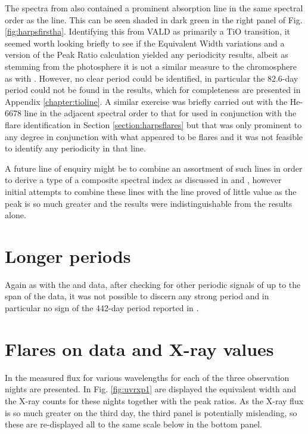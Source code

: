 The spectra from {\harps} also contained a prominent absorption line in the same spectral order as the {\ha} line. This
can be seen shaded in dark green in the right panel of Fig. \ref{fig:harpsfirstha}. Identifying this from VALD as
primarily a TiO transition, it seemed worth looking briefly to see if the Equivalent Width variations and a version of
the Peak Ratio calculation yielded any periodicity results, albeit as stemming from the photosphere it is not a similar
measure to the chromosphere as with \ha. However, no clear period could be identified, in particular the 82.6-day period
could not be found in the results, which for completeness are presented in Appendix \ref{chapter:tioline}. A similar
exercise was briefly carried out with the He-6678 line in the adjacent spectral order to that for {\ha} used in
conjunction with the flare identification in Section \ref{section:harpsflares} but that was only prominent to any degree
in conjunction with what appeared to be flares and it was not feasible to identify any periodicity in that line.

A future line of enquiry might be to combine an assortment of such lines in order to derive a type of a composite
spectral index as discussed in \citet{hall99} and \citet{hall00}, however initial attempts to combine these lines with
the {\ha} line proved of little value as the {\ha} peak is so much greater and the results were indistinguishable from
the {\ha} results alone.

\section{Longer periods}
\protect\label{section:longperiods}

Again as with the {\asas} and {\hst} data, after checking for other periodic signals of up to the span of the data, it
was not possible to discern any strong period and in particular no sign of the 442-day period reported in
\citet{cincunegui07}.

\section{Flares on {\uves} data and X-ray values}
\protect\label{section:uvesflares}

In \citet[fig. 1 to fig. 3]{fuhrmeister11} the measured flux for various wavelengths for each of the three observation
nights are presented. In Fig. \ref{fig:uvrxp1} are displayed the {\ha} equivalent width and the X-ray counts for these
nights together with the peak ratios. As the X-ray flux is so much greater on the third day, the third panel is
potentially misleading, so these are re-displayed all to the same scale below in the bottom panel.

